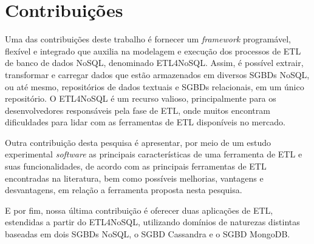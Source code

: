 
\section{Contribuições}

Uma das contribuições deste trabalho é fornecer um \textit{framework} programável, flexível e integrado que auxilia na modelagem e execução dos processos de ETL de banco de dados NoSQL, denominado ETL4NoSQL. Assim, é possível extrair, transformar e carregar dados que estão armazenados em diversos SGBDs NoSQL, ou até mesmo, repositórios de dados textuais e SGBDs relacionais, em um único repositório. O ETL4NoSQL é um recurso valioso, principalmente para os desenvolvedores responsáveis pela fase de ETL, onde muitos encontram dificuldades para lidar com as ferramentas de ETL disponíveis no mercado. 

Outra contribuição desta pesquisa é apresentar, por meio de um estudo experimental \textit{software} as principais características de uma ferramenta de ETL e suas funcionalidades, de acordo com as principais ferramentas de ETL encontradas na literatura, bem como possíveis melhorias, vantagens e desvantagens, em relação a ferramenta proposta nesta pesquisa.

E por fim, nossa última contribuição é oferecer duas aplicações de ETL, estendidas a partir do ETL4NoSQL, utilizando domínios de naturezas distintas baseadas em dois SGBDs NoSQL, o SGBD Cassandra e o SGBD MongoDB. 


